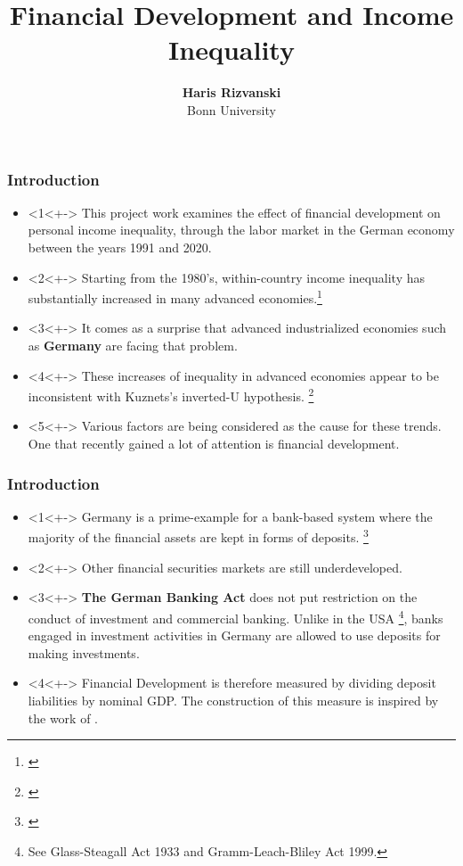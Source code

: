 \documentclass[11pt]{beamer}
\begin{document}
\title{Financial Development and Income Inequality}

\author[Haris Rizvanski]
{
{\bf Haris Rizvanski}\\
{\small Bonn University}\\[1ex]
}


\begin{frame}
    \titlepage
    \note{~}
\end{frame}


\begin{frame}
\frametitle{Introduction}
\begin{itemize}
 \item<1<+-> This project work examines the effect of financial development on personal income inequality, through the labor market in the German economy between the years 1991 and 2020.
 \item<2<+-> Starting from the 1980’s, within-country income inequality has substantially increased in many advanced economies.\footnote {\cite{sarfati2009growing}}
\item<3<+-> It comes as a
surprise that advanced industrialized economies such as \textbf{Germany} are facing that problem.
\item<4<+-> These increases of inequality in advanced economies appear to be inconsistent with Kuznets’s inverted-U hypothesis. \footnote{\cite{kunieda2014finance}}
\item<5<+-> Various factors are being considered as the cause for these trends. One that recently gained a lot of attention is financial development.
\end{itemize}
\end{frame}

\begin{frame}
\frametitle{Introduction}
\begin{itemize}
\item<1<+-> Germany is a prime-example for a bank-based system where the majority of the financial assets are kept in forms of deposits. \footnote{\cite{detzer2015inequality}}
\item<2<+-> Other financial securities markets are still underdeveloped.
\item<3<+-> \textbf{The German Banking Act} does not put restriction on the conduct of investment and commercial banking. Unlike in the USA \footnote{See Glass-Steagall Act 1933 and Gramm-Leach-Bliley Act 1999.}, banks engaged in investment activities in Germany are allowed to use deposits for making investments.
\item<4<+-> Financial Development is therefore measured by dividing deposit liabilities by nominal GDP. The construction of this measure is inspired by the work of \textcolor{blue}{\cite{demetriades1996does}}.
\end{itemize}
\end{frame}
\end{document}

